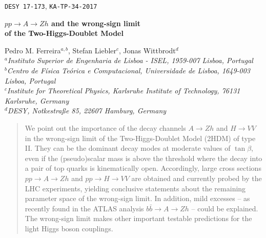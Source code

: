 \documentclass[12pt]{article}
\newcommand{\abbrev}{\scalefont{.9}}
\newcommand{\lhc}{{\abbrev LHC}}
\newcommand{\thdm}{{\abbrev 2HDM}}
\newcommand{\atlas}{{\abbrev ATLAS}}
\begin{document}
\begin{flushleft}
\end{flushleft}
\vspace*{-1.35cm}
\begin{flushright}
{\tt DESY 17-173},
{\tt KA-TP-34-2017 }
\end{flushright}

\long{}

\vspace{0.1cm}

\begin{center}
\Large\bf\boldmath
$pp\to A\to Zh$ and the wrong-sign limit\\ of the Two-Higgs-Doublet Model
\unboldmath
\end{center}
\vspace{0.05cm}
\begin{center}
Pedro M. Ferreira$^{a,b}$,
Stefan Liebler$^c$,
Jonas Wittbrodt$^d$\\[0.4cm]
{\small
{\sl${}^a$Instituto Superior de Engenharia de Lisboa - ISEL, 1959-007 Lisboa,  Portugal}\\[0.2em]
{\sl${}^b$Centro  de  F{\'i}sica  Te{\'o}rica  e  Computacional,  Universidade  de  Lisboa, 1649-003 Lisboa, Portugal}\\[0.2em]
{\sl${}^c$Institute for Theoretical Physics, Karlsruhe Institute of Technology,
76131 Karlsruhe, Germany}\\[0.2em]
{\sl${}^d$DESY, Notkestra{\ss}e 85, 22607 Hamburg, Germany}
}
\end{center}

\begin{abstract}
\noindent
We point out the importance of the decay channels $A\to Zh$
and $H\to VV$ in the wrong-sign limit of the Two-Higgs-Doublet Model (\thdm{}) of type II.
They can be the dominant decay modes at moderate values of $\tan\beta$,
even if the (pseudo)scalar mass is above the threshold
where the decay into a pair of top quarks is kinematically open.
Accordingly, large cross sections $pp\to A\to Zh$ and $pp\to H\to VV$ are obtained
and currently probed by the \lhc{} experiments, yielding conclusive statements
about the remaining parameter space of the wrong-sign limit.
In addition, mild excesses -- as recently found in the \atlas{} analysis $b\bar b \to A\to Zh$ --
could be explained. The wrong-sign limit makes other important testable
predictions for the light Higgs boson couplings.
\end{abstract}
\end{document}
